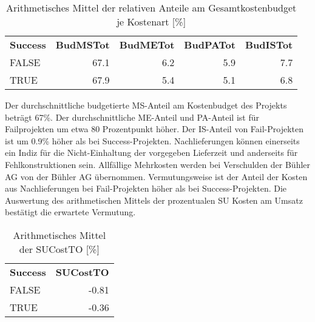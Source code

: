 \begin{table}[htbp]
	\centering
	\caption{Arithmetisches Mittel der relativen Anteile am Gesamtkostenbudget je Kostenart [\%]}
	\begin{tabular}{lrrrr}
		\textbf{Success} & \multicolumn{1}{l}{\textbf{BudMSTot}} & \multicolumn{1}{l}{\textbf{BudMETot}} & \multicolumn{1}{l}{\textbf{BudPATot}} & \multicolumn{1}{l}{\textbf{BudISTot}} \\
		FALSE & 67.1  & 6.2   & 5.9   & 7.7 \\
		TRUE  & 67.9  & 5.4   & 5.1   & 6.8 \\
	\end{tabular}%
	\label{tab:addlabel}%
\end{table}%
Der durchschnittliche budgetierte MS-Anteil am Kostenbudget des Projekts beträgt 67\%. Der durchschnittliche ME-Anteil und PA-Anteil ist für Failprojekten um etwa 80 Prozentpunkt höher. Der IS-Anteil von Fail-Projekten ist um 0.9\% höher als bei Success-Projekten. 
\newline\newline Nachlieferungen können einerseits ein Indiz für die Nicht-Einhaltung der vorgegeben Lieferzeit und anderseits für Fehlkonstruktionen sein. Allfällige Mehrkosten werden bei Verschulden der Bühler AG von der Bühler AG übernommen. Vermutungsweise ist der Anteil der Kosten aus Nachlieferungen bei Fail-Projekten höher als bei Success-Projekten. Die Auswertung des arithmetischen Mittels der prozentualen SU Kosten am Umsatz bestätigt die erwartete Vermutung.
\begin{table}[htbp]
	\centering
	\caption{Arithmetisches Mittel der SUCostTO [\%]}
	\begin{tabular}{lr}
		\textbf{Success} & \multicolumn{1}{l}{\textbf{SUCostTO}} \\
		FALSE & -0.81 \\
		TRUE  & -0.36 \\
	\end{tabular}%
	\label{tab:addlabel}%
\end{table}%

